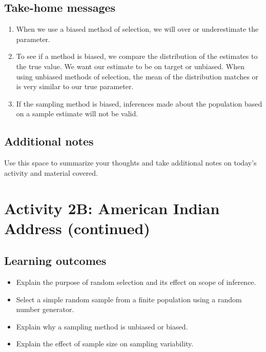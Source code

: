 \documentclass[
]{report}
\begin{document}
\hypertarget{take-home-messages-1}{%
\subsection{Take-home messages}\label{take-home-messages-1}}

\begin{enumerate}
\def\labelenumi{\arabic{enumi}.}
\item
  When we use a biased method of selection, we will over or underestimate the parameter.
\item
  To see if a method is biased, we compare the distribution of the estimates to the true value. We want our estimate to be on target or unbiased. When using unbiased methods of selection, the mean of the distribution matches or is very similar to our true parameter.
\item
  If the sampling method is biased, inferences made about the population based on a sample estimate will not be valid.
\end{enumerate}

\hypertarget{additional-notes-1}{%
\subsection{Additional notes}\label{additional-notes-1}}

Use this space to summarize your thoughts and take additional notes on today's activity and material covered.

\newpage

\hypertarget{activity-2b-american-indian-address-continued}{%
\section{Activity 2B: American Indian Address (continued)}\label{activity-2b-american-indian-address-continued}}


\hypertarget{learning-outcomes-2}{%
\subsection{Learning outcomes}\label{learning-outcomes-2}}

\begin{itemize}
\item
  Explain the purpose of random selection and its effect on scope of inference.
\item
  Select a simple random sample from a finite population using a random number generator.
\item
  Explain why a sampling method is unbiased or biased.
\item
  Explain the effect of sample size on sampling variability.
\end{itemize}
\end{document}

